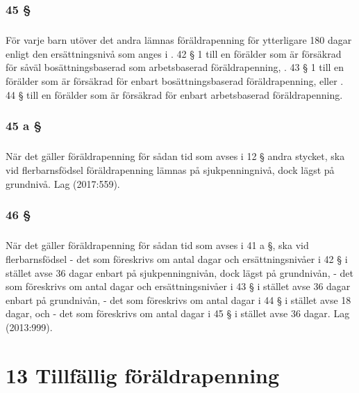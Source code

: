 \documentclass[a4paper,notitlepage,openany,10pt]{book}
\begin{document}
\subsection*{45 §}
\paragraph*{}
För varje barn utöver det andra lämnas föräldrapenning för ytterligare 180 dagar enligt den ersättningsnivå som anges i
. 42 § 1 till en förälder som är försäkrad för såväl bosättningsbaserad som arbetsbaserad föräldrapenning,
. 43 § 1 till en förälder som är försäkrad för enbart bosättningsbaserad föräldrapenning, eller
. 44 § till en förälder som är försäkrad för enbart arbetsbaserad föräldrapenning.
\subsection*{45 a §}
\paragraph*{}
När det gäller föräldrapenning för sådan tid som avses i 12 § andra stycket, ska vid flerbarnsfödsel föräldrapenning lämnas på sjukpenningnivå, dock lägst på grundnivå.
Lag (2017:559).
\subsection*{46 §}
\paragraph*{}
När det gäller föräldrapenning för sådan tid som avses i 41 a §, ska vid flerbarnsfödsel
\newline - det som föreskrivs om antal dagar och ersättningsnivåer i 42 § i stället avse 36 dagar enbart på sjukpenningnivån, dock lägst på grundnivån,
\newline - det som föreskrivs om antal dagar och ersättningsnivåer i 43 § i stället avse 36 dagar enbart på grundnivån,
\newline - det som föreskrivs om antal dagar i 44 § i stället avse 18 dagar, och
\newline - det som föreskrivs om antal dagar i 45 § i stället avse 36 dagar.
Lag (2013:999).
\chapter*{13 Tillfällig föräldrapenning}
\end{document}
